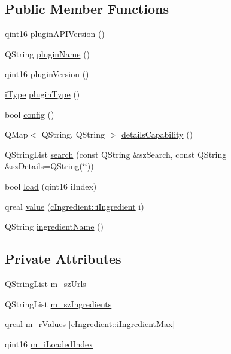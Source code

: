 \subsection*{Public Member Functions}
\begin{DoxyCompactItemize}
\item 
qint16 \hyperlink{classc_bleib_fit_plugin_aad11be7cf80b28becc6024e3827d4f75}{plugin\+A\+P\+I\+Version} ()
\item 
Q\+String \hyperlink{classc_bleib_fit_plugin_aca281bc00f83bc4cd4b620a448825147}{plugin\+Name} ()
\item 
qint16 \hyperlink{classc_bleib_fit_plugin_acb4fbabe875079913c8bbbbe7d9089f6}{plugin\+Version} ()
\item 
\hyperlink{classc_interface_a41462a3131755963add9ba3026e7d31a}{i\+Type} \hyperlink{classc_bleib_fit_plugin_af2fc76ea7b59899780c5384721a88ebd}{plugin\+Type} ()
\item 
bool \hyperlink{classc_bleib_fit_plugin_a4ae455b66593fa29d82025b084c2639b}{config} ()
\item 
Q\+Map$<$ Q\+String, Q\+String $>$ \hyperlink{classc_bleib_fit_plugin_af3db6c6ff6bb28787d67e4cc3e957e90}{details\+Capability} ()
\item 
Q\+String\+List \hyperlink{classc_bleib_fit_plugin_a71d3dc9fc52a807e33608f2522c1ca31}{search} (const Q\+String \&sz\+Search, const Q\+String \&sz\+Details=Q\+String(\char`\"{}\char`\"{}))
\item 
bool \hyperlink{classc_bleib_fit_plugin_a15e5627fa41d2f079a96267e559fccee}{load} (qint16 i\+Index)
\item 
qreal \hyperlink{classc_bleib_fit_plugin_adb3cc6882c32a04d6d9f31961f0b8dca}{value} (\hyperlink{classc_ingredient_acf023723841ec66cd6368a25e3174a28}{c\+Ingredient\+::i\+Ingredient} i)
\item 
Q\+String \hyperlink{classc_bleib_fit_plugin_a67b808ffb0884950a8652cc72e8b2d80}{ingredient\+Name} ()
\end{DoxyCompactItemize}
\subsection*{Private Attributes}
\begin{DoxyCompactItemize}
\item 
Q\+String\+List \hyperlink{classc_bleib_fit_plugin_ada1ca6d46ebd839f6f86bfee1ed0abb8}{m\+\_\+sz\+Urls}
\item 
Q\+String\+List \hyperlink{classc_bleib_fit_plugin_a255890766758afcab2c358bfb8695a15}{m\+\_\+sz\+Ingredients}
\item 
qreal \hyperlink{classc_bleib_fit_plugin_aa9bed63f126286a26ef3b45bfa5fbdcb}{m\+\_\+r\+Values} \mbox{[}\hyperlink{classc_ingredient_acf023723841ec66cd6368a25e3174a28af55d4002286e1c85ff2fecbc7c081509}{c\+Ingredient\+::i\+Ingredient\+Max}\mbox{]}
\item 
qint16 \hyperlink{classc_bleib_fit_plugin_a381f973f2b98c90e22314a5e1855f3df}{m\+\_\+i\+Loaded\+Index}
\end{DoxyCompactItemize}
